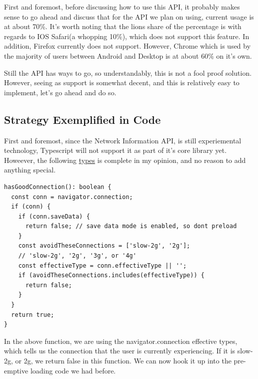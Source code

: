 First and foremost, before discussing how to use this API, it probably makes 
sense to go ahead and discuss that for the API we plan on using, current usage 
is at about 70\%. It's worth noting that the lions share of the percentage is 
with regards to IOS Safari(a whopping 10\%), which does not support this feature. 
In addition, Firefox currently does not support. However, Chrome which is used 
by the majority of users between Android and Desktop is at about 60\% on it's own. 

Still the API has ways to go, so understandably, this is not a fool proof 
solution. However, seeing as support is somewhat decent, and this is relatively 
easy to implement, let's go ahead and do so. 

\subsection{ Strategy Exemplified in Code }

First and foremost, since the Network Information API, is still experiemental 
technology, Typescript will not support it as part of it's core library yet. 
Howeever, the following \href{https://github.com/lacolaco/network-information-types}{types}
is complete in my opinion, and no reason to add anything special. 

\begin{lstlisting}[caption=custom-preloading.ts]
hasGoodConnection(): boolean {
  const conn = navigator.connection;
  if (conn) {
    if (conn.saveData) {
      return false; // save data mode is enabled, so dont preload
    }
    const avoidTheseConnections = ['slow-2g', '2g'];
    // 'slow-2g', '2g', '3g', or '4g'
    const effectiveType = conn.effectiveType || '';
    if (avoidTheseConnections.includes(effectiveType)) {
      return false;
    }
  }
  return true;
}
\end{lstlisting}

In the above function, we are using the navigator.connection effective types, 
which tells us the connection that the user is currently experiencing. If it is slow-2g, 
or 2g, we return false in this function. We can now hook it up into the pre-emptive loading
code we had before. 

